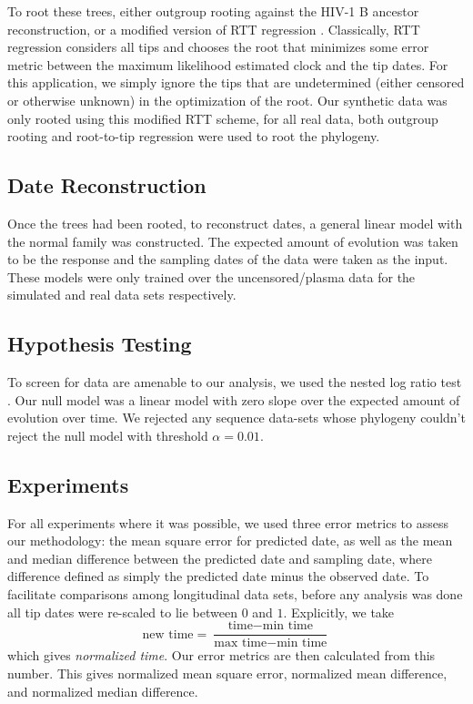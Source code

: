 To root these trees, either outgroup rooting against the HIV-1 B ancestor reconstruction, or a modified version of RTT regression \citep{APE}. 
Classically, RTT regression considers all tips and chooses the root that minimizes some error metric between the maximum likelihood estimated clock and the tip dates. 
For this application, we simply ignore the tips that are undetermined (either censored or otherwise unknown) in the optimization of the root. 
Our synthetic data was only rooted using this modified RTT scheme, for all real data, both outgroup rooting and root-to-tip regression were used to root the phylogeny. 


\subsection{Date Reconstruction} \label{subsec:daterecon}
Once the trees had been rooted, to reconstruct dates, a general linear model with the normal family was constructed. 
The expected amount of evolution was taken to be the response and the sampling dates of the data were taken as the input. 
These models were only trained over the uncensored/plasma data for the simulated and real data sets respectively.

\subsection{Hypothesis Testing} \label{subsec:hypot}
To screen for data are amenable to our analysis, we used the nested log ratio test \citep{Ho14}. 
Our null model was a linear model with zero slope over the expected amount of evolution over time. 
We rejected any sequence data-sets whose phylogeny couldn't reject the null model with threshold $\alpha=0.01$.


\subsection{Experiments} \label{subsec:experiments}
For all experiments where it was possible, we used three error metrics to assess  our methodology: the mean square error for predicted date, as well as the mean and median difference between the predicted date and sampling date, where difference defined as simply the predicted date minus the observed date.
To facilitate comparisons among longitudinal data sets, before any analysis was done all tip dates were re-scaled to lie between $0$ and $1$. 
Explicitly, we take $$ \text{new time} = \frac{\text{time} - \text{min time}}{\text{max time} - \text{min time}}$$ which gives {\em normalized time}. Our error metrics are then calculated from this number. This gives normalized mean square error, normalized mean difference, and normalized median difference. 

